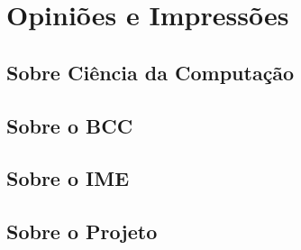 \chapter{Opiniões e Impressões}
\label{cap:sub}

\section{Sobre Ciência da Computação}

\section{Sobre o BCC}

\section{Sobre o IME}

\section{Sobre o Projeto}